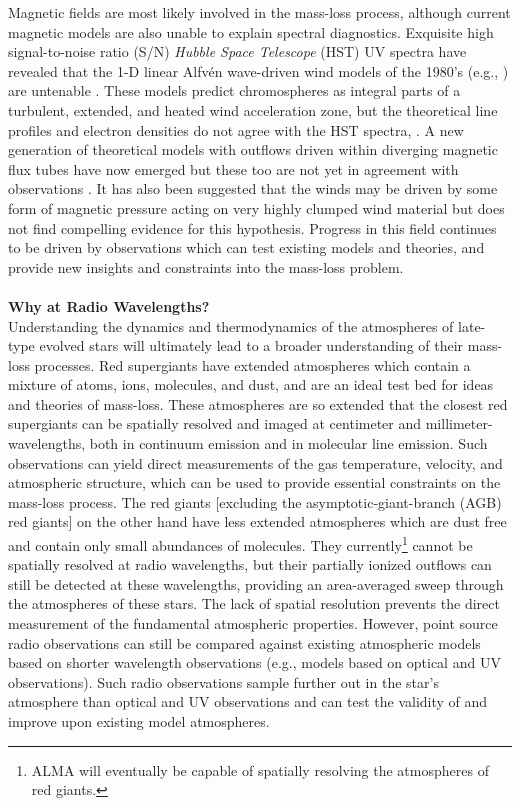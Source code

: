Magnetic fields are most likely involved in the mass-loss process, although current magnetic models are also unable to explain spectral diagnostics. Exquisite high signal-to-noise ratio (S/N) \textit{Hubble Space Telescope} (HST) UV spectra have revealed that the 1-D linear Alfv\'en wave-driven wind models of the 1980’s (e.g., \citealt{hartmann_1980,harper_1988}) are untenable \citep{harper_2001}. These models predict chromospheres as integral parts of a turbulent, extended, and heated wind acceleration zone, but the theoretical line profiles and electron densities do not agree with the HST spectra, \cite[e.g.,][]{judge_1998}. A new generation of theoretical models with outflows driven within diverging magnetic flux tubes have now emerged \citep{falceta_2006, suzuki_2007} but these too are not yet in agreement with observations \citep{crowley_2009}. It has also been suggested that the winds may be driven by some form of magnetic pressure acting on very highly clumped wind material \citep{eaton_2008} but \cite{harper_2010} does not find compelling evidence for this hypothesis. Progress in this field continues to be driven by observations which can test existing models and theories, and provide new insights and constraints into the mass-loss problem.\\
\\
\textbf{Why at Radio Wavelengths?}\\
Understanding the dynamics and thermodynamics of the atmospheres of late-type evolved stars will ultimately lead to a broader understanding of their mass-loss processes. Red supergiants have extended atmospheres which contain a mixture of atoms, ions, molecules, and dust, and are an ideal test bed for ideas and theories of mass-loss. These atmospheres are so extended that the closest red supergiants can be spatially resolved and imaged at centimeter and millimeter-wavelengths, both in continuum emission and in molecular line emission. Such observations can yield direct measurements of the gas temperature, velocity, and atmospheric structure, which can be used to provide essential constraints on the mass-loss process. The red giants [excluding the  asymptotic-giant-branch (AGB) red giants] on the other hand have less extended atmospheres which are dust free and contain only small abundances of molecules. They currently\footnote{ALMA will eventually be capable of spatially resolving the atmospheres of red giants.} cannot be spatially resolved at radio wavelengths, but their partially ionized outflows can still be detected at these wavelengths, providing an area-averaged sweep through the atmospheres of these stars. The lack of spatial resolution prevents the direct measurement of the fundamental atmospheric properties. However, point source radio observations can still be compared against existing atmospheric models based on shorter wavelength observations (e.g., models based on optical and UV observations). Such radio observations sample further out in the star's atmosphere than optical and UV observations and can test the validity of and improve upon existing model atmospheres. 

